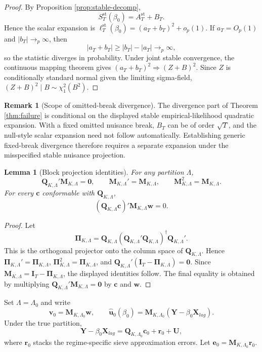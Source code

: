 \documentclass[12pt]{article}
\numberwithin{equation}{section}
\newtheorem{lemma}{Lemma}
\theoremstyle{definition}
\newtheorem{remark}{Remark}
\begin{document}
\begin{proof}
By Proposition \ref{prop:stable-decomp},
\[
    S_T^{\mathrm{st}}(\beta_0)=A_T^{\mathrm{st}}+B_T.
\]
Hence the scalar expansion is \(\ell_T^{\mathrm{st}}(\beta_0)=(a_T+b_T)^2+o_p(1)\). If \(a_T=O_p(1)\) and \(|b_T|\to_p\infty\), then
\[
    |a_T+b_T|\geq |b_T|-|a_T|\to_p\infty,
\]
so the statistic diverges in probability. Under joint stable convergence, the continuous mapping theorem gives \((a_T+b_T)^2\Rightarrow (Z+B)^2\). Since \(Z\) is conditionally standard normal given the limiting sigma-field, \((Z+B)^2\mid B\sim\chi_1^2(B^2)\).
\end{proof}

\begin{remark}[Scope of omitted-break divergence]
The divergence part of Theorem \ref{thm:failure} is conditional on the displayed stable empirical-likelihood quadratic expansion. With a fixed omitted nuisance break, \(B_T\) can be of order \(\sqrt T\), and the null-style scalar expansion need not follow automatically. Establishing generic fixed-break divergence therefore requires a separate expansion under the misspecified stable nuisance projection.
\end{remark}

\begin{lemma}[Block projection identities]
\label{lem:block-identities}
For any partition \(\Lambda\),
\[
    \bm Q_{K,\Lambda}'\bm M_{K,\Lambda}=\bm0,
    \qquad
    \bm M_{K,\Lambda}'=\bm M_{K,\Lambda},
    \qquad
    \bm M_{K,\Lambda}^2=\bm M_{K,\Lambda}.
\]
For every \(\bm c\) conformable with \(\bm Q_{K,\Lambda}\),
\[
    (\bm Q_{K,\Lambda}\bm c)'\bm M_{K,\Lambda}\bm w=0.
\]
\end{lemma}

\begin{proof}
Let
\[
    \bm\Pi_{K,\Lambda}
    =
    \bm Q_{K,\Lambda}(\bm Q_{K,\Lambda}'\bm Q_{K,\Lambda})^\dagger\bm Q_{K,\Lambda}'.
\]
This is the orthogonal projector onto the column space of \(\bm Q_{K,\Lambda}\). Hence \(\bm\Pi_{K,\Lambda}'=\bm\Pi_{K,\Lambda}\), \(\bm\Pi_{K,\Lambda}^2=\bm\Pi_{K,\Lambda}\), and \(\bm Q_{K,\Lambda}'(\bm I_T-\bm\Pi_{K,\Lambda})=\bm0\). Since \(\bm M_{K,\Lambda}=\bm I_T-\bm\Pi_{K,\Lambda}\), the displayed identities follow. The final equality is obtained by multiplying \(\bm Q_{K,\Lambda}'\bm M_{K,\Lambda}=\bm0\) by \(\bm c\) and \(\bm w\).
\end{proof}

Set \(\Lambda=\Lambda_0\) and write
\[
    \bm v_0=\bm M_{K,\Lambda_0}\bm w,
    \qquad
    \widehat{\bm u}_0(\beta_0)=\bm M_{K,\Lambda_0}(\bm Y-\beta_0\bm X_{lag}).
\]
Under the true partition,
\[
    \bm Y-\beta_0\bm X_{lag}
    =
    \bm Q_{K,\Lambda_0}\bm c_0+\bm r_0+\bm U,
\]
where \(\bm r_0\) stacks the regime-specific sieve approximation errors. Let \(\bm e_0=\bm M_{K,\Lambda_0}\bm r_0\).
\end{document}
